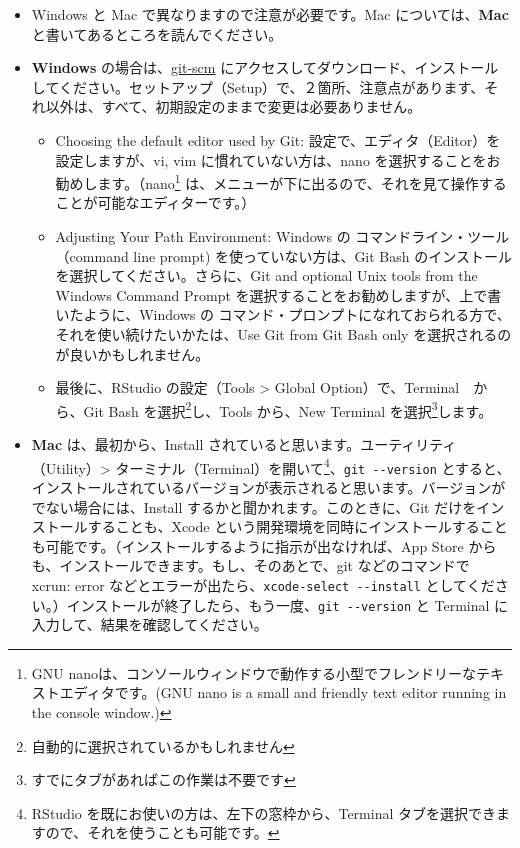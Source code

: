 \documentclass[
  xelatex, ja=standard]{bxjsbook}
\providecommand{\tightlist}{%
  \setlength{\itemsep}{0pt}\setlength{\parskip}{0pt}}
\theoremstyle{definition}
\theoremstyle{definition}
\theoremstyle{definition}
\theoremstyle{definition}
\theoremstyle{remark}
\begin{document}
\begin{itemize}
\tightlist
\item
  Windows と Mac で異なりますので注意が必要です。Mac については、\textbf{Mac} と書いてあるところを読んでください。
\item
  \textbf{Windows} の場合は、\href{https://git-scm.com/download/win}{git-scm} にアクセスしてダウンロード、インストールしてください。セットアップ（Setup）で、２箇所、注意点があります、それ以外は、すべて、初期設定のままで変更は必要ありません。

  \begin{itemize}
  \tightlist
  \item
    Choosing the default editor used by Git: 設定で、エディタ（Editor）を設定しますが、vi, vim に慣れていない方は、nano を選択することをお勧めします。（nano\footnote{GNU nanoは、コンソールウィンドウで動作する小型でフレンドリーなテキストエディタです。(GNU nano is a small and friendly text editor running in the console window.)} は、メニューが下に出るので、それを見て操作することが可能なエディターです。）
  \item
    Adjusting Your Path Environment: Windows の コマンドライン・ツール（command line prompt) を使っていない方は、Git Bash のインストールを選択してください。さらに、Git and optional Unix tools from the Windows Command Prompt を選択することをお勧めしますが、上で書いたように、Windows の コマンド・プロンプトになれておられる方で、それを使い続けたいかたは、Use Git from Git Bash only を選択されるのが良いかもしれません。
  \item
    最後に、RStudio の設定（Tools \textgreater{} Global Option）で、Terminal　から、Git Bash を選択\footnote{自動的に選択されているかもしれません}し、Tools から、New Terminal を選択\footnote{すでにタブがあればこの作業は不要です}します。
  \end{itemize}
\item
  \textbf{Mac} は、最初から、Install されていると思います。ユーティリティ（Utility）\textgreater{} ターミナル（Terminal）を開いて\footnote{RStudio を既にお使いの方は、左下の窓枠から、Terminal タブを選択できますので、それを使うことも可能です。}、\texttt{git\ -\/-version} とすると、インストールされているバージョンが表示されると思います。バージョンがでない場合には、Install するかと聞かれます。このときに、Git だけをインストールすることも、Xcode という開発環境を同時にインストールすることも可能です。（インストールするように指示が出なければ、App Store からも、インストールできます。もし、そのあとで、git などのコマンドで xcrun: error などとエラーが出たら、\texttt{xcode-select\ -\/-install} としてください。）インストールが終了したら、もう一度、\texttt{git\ -\/-version} と Terminal に入力して、結果を確認してください。
\end{itemize}
\end{document}
